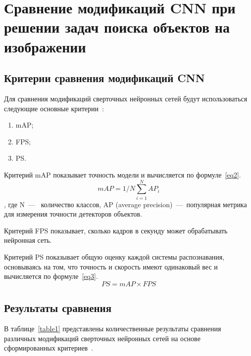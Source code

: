 \chapter{Сравнение модификаций CNN при решении задач поиска объектов на изображении}

\section{Критерии сравнения модификаций CNN}

Для сравнения модификаций сверточных нейронных сетей будут использоваться следующие основные критерии~\cite{base, all, yolobase, cmp}:
\begin{enumerate}
	\item mAP;
	\item FPS;
	\item PS.
\end{enumerate}

Критерий mAP показывает точность модели и вычисляется по формуле~\ref{eq2}.
\begin{equation}
	\label{eq2}
	mAP = 1/N \sum_{i=1}^{N} AP_{i}
\end{equation}
, где N~---~ количество классов,
AP (average precision)~---~популярная метрика для измерения точности детекторов объектов.

Критерий FPS показывает, сколько кадров в секунду может обрабатывать нейронная сеть.

Критерий PS показывает общую оценку каждой системы распознавания, основываясь на том, что точность и скорость имеют одинаковый вес и вычисляется по формуле~\ref{eq3}.
\begin{equation}
	\label{eq3}
	PS = mAP \times FPS
\end{equation}

\section{Результаты сравнения}

В таблице~\ref{table1} представлены количественные результаты сравнения различных модификаций сверточных нейронных сетей на основе сформированных критериев~\cite{all, yolobase}.

